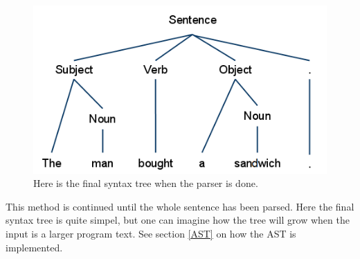 \begin{figure}[H]
\begin{center}
\includegraphics[scale=0.5]{Images/parsingexample/AST5.png}
\end{center}
\caption{Here is the final syntax tree when the parser is done.}
\end{figure}

This method is continued until the whole sentence has been parsed. Here the final syntax tree is quite simpel, but one can imagine how the tree will grow when the input is a larger program text. See section \ref{AST} on how the AST is implemented.